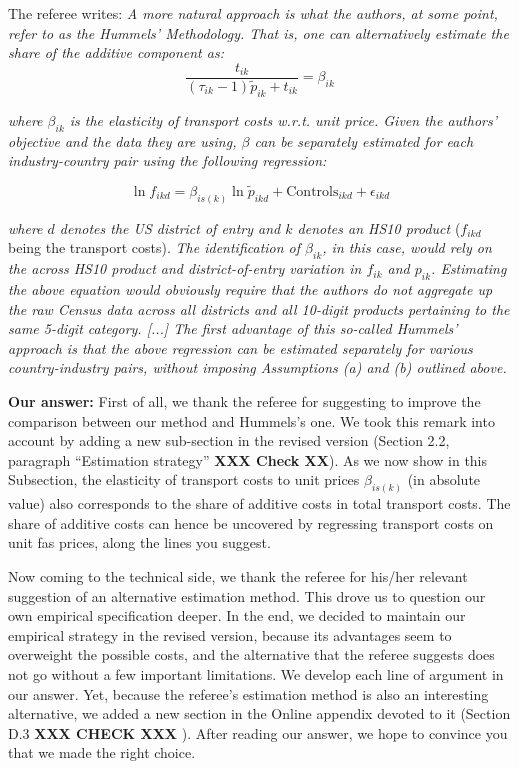 \documentclass[a4paper,11pt]{article}
\begin{document}
The referee writes: \textit{A more natural approach is what the authors, at some point, refer to as the Hummels' Methodology. That is, one can alternatively estimate the share of the additive component as:}
$$\frac{t_{ik}}{ (\tau_{ik}-1)\tilde{p}_{ik} + t_{ik}} = \beta_{ik}$$

\textit{where $\beta_{ik}$ is the elasticity of transport costs w.r.t. unit price. Given the authors' objective and the data they are using, $\beta$ can be separately estimated for each industry-country pair using the following regression:}

\begin{equation}
\ln f_{ikd} = \beta_{is(k)}\ln \tilde{p}_{ikd} + \text{Controls}_{ikd} +\epsilon_{ikd} \label{eq:estimation_ref1}
\end{equation}

\textit{where $d$ denotes the US district of entry and $k$ denotes an HS10 product} ($f_{ikd}$ being the transport costs). \textit{The
identification of $\beta_{ik}$, in this case, would rely on the across HS10 product and
district-of-entry variation in $f_{ik}$ and $p_{ik}$. Estimating the above equation would
obviously require that the authors do not aggregate up the raw Census data
across all districts and all 10-digit products pertaining to the same 5-digit category. [...] The first advantage of this so-called Hummels' approach is that the above regression can be estimated separately for various country-industry pairs, without imposing Assumptions (a) and (b) outlined above.}

\textbf{Our answer:} First of all, we thank the referee for suggesting to improve the comparison between our method and Hummels's one. We took this remark into account by adding a new sub-section in the revised version (Section 2.2, paragraph ``Estimation strategy'' \textbf{XXX Check XX}). As we now show in this Subsection, the elasticity of transport costs to unit prices $\beta_{is(k)}$ (in absolute value) also corresponds to the share of additive costs in total transport costs. The share of additive costs can hence be uncovered by regressing transport costs on unit fas prices, along the lines you suggest.

Now coming to the technical side, we thank the referee for his/her relevant suggestion of an alternative estimation method. This drove us to question our own empirical specification deeper. In the end, we decided to maintain our empirical strategy in the revised version, because its advantages seem to overweight the possible costs, and the alternative that the referee suggests does not go without a few important limitations. We develop each line of argument in our answer. Yet, because the referee's estimation method is also an interesting alternative, we added a new section in the Online appendix devoted to it (Section D.3 \textbf{XXX CHECK XXX }). After reading our answer, we hope to convince you that we made the right choice.
\end{document}
